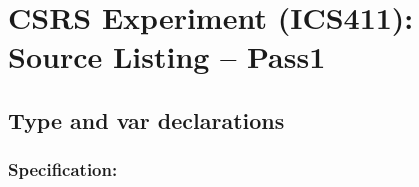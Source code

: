 \chapter {CSRS Experiment (ICS411): Source Listing -- Pass1}
\small
	  

\section{Type and var declarations}
\subsection*{Specification:}

